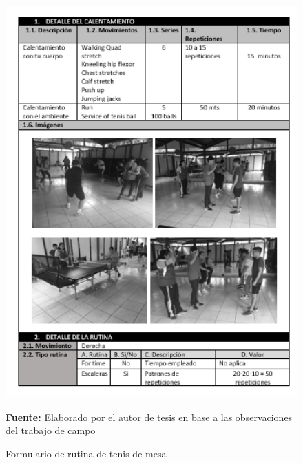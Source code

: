 \begin{figure}[H]
	\caption{Formulario de rutina de tenis de mesa}
	\label{fig:frmRoutTen}
	\centering
	\includegraphics[width=445px,height=600px]{graphics/resultados/rutina-tennis.PNG} \\
	\textbf{Fuente:} Elaborado por el autor de tesis en base a las observaciones del trabajo de campo
\end{figure}
